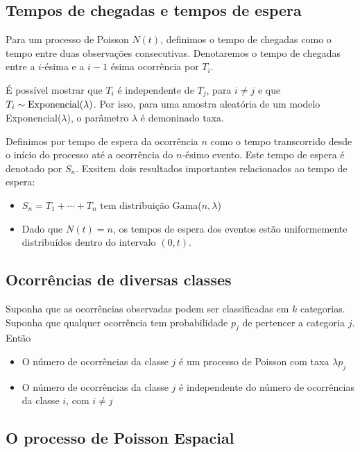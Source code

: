 \documentclass[
  letterpaper,
  DIV=11,
  numbers=noendperiod]{scrreprt}
\theoremstyle{definition}
\theoremstyle{definition}
\theoremstyle{plain}
\theoremstyle{remark}
\begin{document}
\subsection{Tempos de chegadas e tempos de
espera}\label{tempos-de-chegadas-e-tempos-de-espera-1}

Para um processo de Poisson \(N(t)\), definimos o tempo de chegadas como
o tempo entre duas observações consecutivas. Denotaremos o tempo de
chegadas entre a \(i\)-ésima e a \(i-1\) ésima ocorrência por \(T_i\).

É possível mostrar que \(T_i\) é independente de \(T_j\), para
\(i\neq j\) e que \(T_i\sim\hbox{Exponencial}(\lambda)\). Por isso, para
uma amostra aleatória de um modelo Exponencial(\(\lambda\)), o parâmetro
\(\lambda\) é demoninado taxa.

Definimos por tempo de espera da ocorrência \(n\) como o tempo
transcorrido desde o início do processo até a ocorrência do \(n\)-ésimo
evento. Este tempo de espera é denotado por \(S_n\). Exsitem dois
resultados importantes relacionados ao tempo de espera:

\begin{itemize}
\item
  \(S_n=T_1+\cdots+T_n\) tem distribuição Gama(\(n,\lambda\))
\item
  Dado que \(N(t)=n\), os tempos de espera dos eventos estão
  uniformemente distribuídos dentro do intervalo \((0,t)\).
\end{itemize}

\subsection{Ocorrências de diversas
classes}\label{ocorruxeancias-de-diversas-classes-1}

Suponha que as ocorrências observadas podem ser classificadas em \(k\)
categorias. Suponha que qualquer ocorrência tem probabilidade \(p_j\) de
pertencer a categoria \(j\). Então

\begin{itemize}
\item
  O número de ocorrências da classe \(j\) é um processo de Poisson com
  taxa \(\lambda p_j\)
\item
  O número de ocorrências da classe \(j\) é independente do número de
  ocorrências da classe \(i\), com \(i\neq j\)
\end{itemize}

\subsection{O processo de Poisson
Espacial}\label{o-processo-de-poisson-espacial-1}
\end{document}
